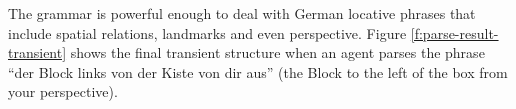 The grammar is powerful enough to deal with German locative
phrases that include spatial relations, landmarks and even perspective.
Figure \ref{f:parse-result-transient} shows the final transient structure when an agent
parses the phrase ``der Block links von der Kiste von dir aus'' (the Block
to the left of the box from your perspective).





%
% 
%
